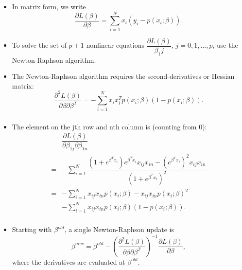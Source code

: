 \documentclass[12pt,notes,mathserif]{beamer}
\begin{document}
\begin{frame}[c]
	\frametitle{}
	\begin{itemize}
		\item  In matrix form, we write
		      \begin{equation*}
			      \dfrac{\partial L(\beta)}{\partial\beta}=
			      \sum\limits_{i=1}^{N}
			      x_i(y_i-p(x_i;\beta)).
		      \end{equation*}
		\item
		      To solve the set of $p + 1$ nonlinear equations
		      $\dfrac{\partial L(\beta )}{\beta_1j}$,
		      $j = 0,1,...,p$, use the Newton-Raphson algorithm.
		\item
		      The Newton-Raphson algorithm requires the second-derivatives or Hessian matrix:
		      \begin{equation*}
			      \dfrac{\partial^2 L(\beta )}{\partial\beta\partial\beta^T}=-
			      \sum\limits_{i=1}^{N}
			      x_ix_i^Tp(x_i;\beta)(1-p(x_i;\beta)).
		      \end{equation*}
	\end{itemize}
\end{frame}

\begin{frame}[c]
	\frametitle{}
	\begin{itemize}
		\item
		      The element on the jth row and nth column is (counting from 0):
		      \begin{align*}
			        & \dfrac{\partial L(\beta )}{\partial\beta_{1j}\partial\beta_{1n}}                                                                \\
			      = & -\sum\limits_{i=1}^{N}\dfrac{(1+e^{\beta^Tx_i})e^{\beta^Tx_i}x_{ij}x_{in}-(e^{\beta^Tx_i})^2x_{ij}x_{in}}{(1+e^{\beta^Tx_i})^2} \\
			      = & -\sum\limits_{i=1}^{N}x_{ij}x_{in}p(x_i;\beta)-x_{ij}x_{in}p(x_i;\beta)^2                                                       \\
			      = & -\sum\limits_{i=1}^{N}x_{ij}x_{in}p(x_i;\beta)(1-p(x_i;\beta)).
		      \end{align*}
	\end{itemize}
\end{frame}

\begin{frame}[c]
	\frametitle{}
	\begin{itemize}
		\item
		      Starting with $\beta^{old}$, a single Newton-Raphson update is
		      \begin{equation*}
			      \beta^{new}=\beta^{old}-\left(\dfrac{\partial^2 L(\beta )}{\partial\beta\partial\beta^T}\right)^{-1}\dfrac{\partial L(\beta )}{\partial\beta},
		      \end{equation*}
		      where the derivatives are evaluated at $\beta^{old}$.
	\end{itemize}
\end{frame}
\end{document}

